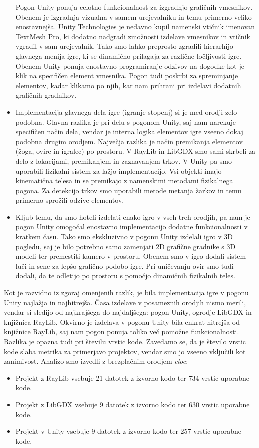 \documentclass[12pt,a4paper,twoside]{book}
\begin{document}
\begin{itemize}
	Pogon Unity ponuja celotno funkcionalnost za izgradnjo grafičnih vmesnikov. Obenem je izgradnja vizualna v samem urejevalniku in temu primerno veliko enostavnejša. Unity Technologies je nedavno kupil namenski vtičnik imenovan TextMesh Pro, ki dodatno nadgradi zmožnosti izdelave vmesnikov in vtičnik vgradil v sam urejevalnik. Tako smo lahko preprosto zgradili hierarhijo glavnega menija igre, ki se dinamično prilagaja za različne ločljivosti igre. Obenem Unity ponuja enostavno programiranje odzivov na dogodke kot je klik na specifičen element vmesnika. Pogon tudi poskrbi za spreminjanje elementov, kadar klikamo po njih, kar nam prihrani pri izdelavi dodatnih grafičnih gradnikov.
	\item Implementacija glavnega dela igre (igranje stopenj) si je med orodji zelo podobna. Glavna razlika je pri delu s pogonom Unity, saj nam narekuje specifičen način dela, vendar je interna logika elementov igre vseeno dokaj podobna drugim orodjem. Največja razlika je način premikanja elementov (žoga, ovire in igralec) po prostoru. V RayLib in LibGDX smo sami skrbeli za delo z lokacijami, premikanjem in zaznavanjem trkov. V Unity pa smo uporabili fizikalni sistem za lažjo implementacijo. Vsi objekti imajo kinematična telesa in se premikajo z namenskimi metodami fizikalnega pogona. Za detekcijo trkov smo uporabili metode metanja žarkov in temu primerno sprožili odzive elementov.
	\item Kljub temu, da smo hoteli izdelati enako igro v vseh treh orodjih, pa nam je pogon Unity omogočal enostavno implementacijo dodatne funkcionalnosti v kratkem času. Tako smo ekskluzivno v pogonu Unity izdelali igro v 3D pogledu, saj je bilo potrebno samo zamenjati 2D grafične gradnike s 3D modeli ter premestiti kamero v prostoru. Obenem smo v igro dodali sistem luči in senc za lepšo grafično podobo igre. Pri uničevanju ovir smo tudi dodali, da te odletijo po prostoru s pomočjo dinamičnih fizikalnih teles.
\end{itemize}

Kot je razvidno iz zgoraj omenjenih razlik, je bila implementacija igre v pogonu Unity najlažja in najhitrejša. Časa izdelave v posameznih orodjih nismo merili, vendar si sledijo od najkrajšega do najdaljšega: pogon Unity, ogrodje LibGDX in knjižnica RayLib. Okvirno je izdelava v pogonu Unity bila enkrat hitrejša od knjižnice RayLib, saj nam pogon ponuja toliko več pomožne funkcionalnosti. Razlika je opazna tudi pri številu vrstic kode. Zavedamo se, da je število vrstic kode slaba metrika za primerjavo projektov, vendar smo jo vseeno vključili kot zanimivost. Analizo smo izvedli z brezplačnim orodjem \textit{cloc}:
\begin{itemize}
	\item Projekt z RayLib vsebuje 21 datotek z izvorno kodo ter 734 vrstic uporabne kode.
	\item Projekt z LibGDX vsebuje 9 datotek z izvorno kodo ter 630 vrstic uporabne kode.
	\item Projekt v Unity  vsebuje 9 datotek z izvorno kodo ter 257 vrstic uporabne kode.
\end{itemize} 
\end{document}
